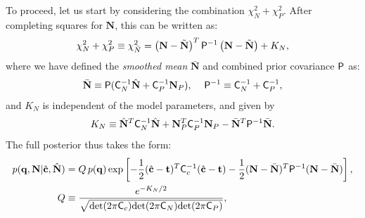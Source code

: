 \documentclass[a4paper,11pt]{article}
\newcommand{\vN}{\mathbf{N}}
\begin{document}
      To proceed, let us start by considering the combination $\chi^2_N+\chi^2_P$. After completing squares for $\vN$, this can be written as:
      \begin{equation}
        \chi^2_N+\chi^2_P\equiv\chi^2_{\bar{N}}=\left(\vN-\tilde{\vN}\right)^T{\sf P}^{-1}\left(\vN-\tilde{\vN}\right)+K_N,
      \end{equation}
      where we have defined the \emph{smoothed mean} $\bar{\vN}$ and combined prior covariance ${\sf P}$ as:
      \begin{align}\label{eq:priorcov}
        \bar{\vN}\equiv{\sf P}({\sf C}_N^{-1}\hat{\bf N}+{\sf C}_P^{-1}\vN_P),\hspace{12pt} {\sf P}^{-1}\equiv{\sf C}_N^{-1}+{\sf C}_P^{-1},
      \end{align}
      and $K_N$ is independent of the model parameters, and given by
      \begin{equation}
        K_N\equiv\hat{\bf N}^T{\sf C}^{-1}_N\hat{\bf N}+\vN_P^T{\sf C}_P^{-1}\vN_P-\bar{\vN}^T{\sf P}^{-1}\bar{\vN}.
      \end{equation}
      The full posterior thus takes the form:
      \begin{align}
        p({\bf q},\vN|\hat{\bf c},\hat{\bf N})&=Q\,p({\bf q})\exp\left[-\frac{1}{2}(\hat{\bf c}-{\bf t})^T{\sf C}^{-1}_c(\hat{\bf c}-{\bf t})-\frac{1}{2}(\vN-\bar{\vN})^T{\sf P}^{-1}(\vN-\bar{\vN})\right],\\
        Q&\equiv\frac{e^{-K_N/2}}{\sqrt{{\rm det}(2\pi{\sf C}_c){\rm det}(2\pi{\sf C}_N){\rm det}(2\pi{\sf C}_P)}},
      \end{align}

\end{document}
